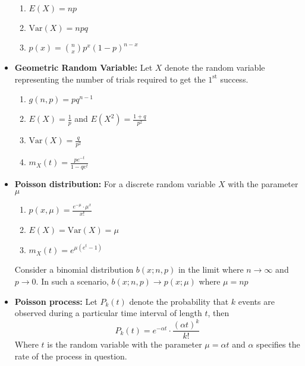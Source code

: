 \documentclass[a4paper]{article}
\begin{document}
\begin{itemize}
\begin{enumerate}
        \item $E(X) = np$
        \item $\text{Var}(X) = npq$
        \item $p(x) = {n\choose x}p^x(1-p)^{n-x}$
    \end{enumerate}
    \item \textbf{Geometric Random Variable: } Let $X$ denote the random variable representing the number of trials required to get the $1^{\text{st}}$ success.
    \begin{enumerate}
        \item $g(n,p) = pq^{n-1}$
        \item $E(X) = \frac{1}{p}$ and $E(X^2) = \frac{1+q}{p^2}$
        \item $\text{Var}(X) = \frac{q}{p^2}$
        \item $m_X(t) = \frac{pe^{-t}}{1-qe^t}$
    \end{enumerate}
    \item \textbf{Poisson distribution: }For a discrete random variable $X$ with the parameter $\mu$
    \begin{enumerate}
        \item $p(x,\mu) = \frac{e^{-\mu}\cdot\mu^x}{x!}$
        \item $E(X) = \text{Var}(X) = \mu$
        \item $m_X(t) = e^{\mu(e^t-1)}$
    \end{enumerate}
    Consider a binomial distribution $b(x; n,p)$ in the limit where $n\rightarrow\infty$ and $p\rightarrow 0$. In such a scenario, $b(x; n,p)\rightarrow p(x; \mu)$ where $\mu = np$
    \item \textbf{Poisson process: } Let $P_k(t)$ denote the probability that $k$ events are observed during a particular time interval of length $t$, then
    \begin{equation*}
        P_k(t) = e^{-\alpha t}\cdot\frac{(\alpha t)^k}{k!}
    \end{equation*}
    Where $t$ is the random variable with the parameter $\mu = \alpha t$ and $\alpha$ specifies the rate of the process in question.
\end{itemize}
\end{document}
